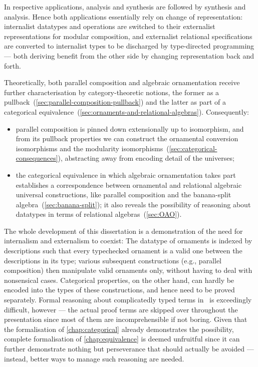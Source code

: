 In respective applications, analysis and synthesis are followed by synthesis and analysis.
Hence both applications essentially rely on change of representation: internalist datatypes and operations are switched to their externalist representations for modular composition, and externalist relational specifications are converted to internalist types to be discharged by type-directed programming --- both deriving benefit from the other side by changing representation back and forth.

Theoretically, both parallel composition and algebraic ornamentation receive further characterisation by category-theoretic notions, the former as a pullback~(\autoref{sec:parallel-composition-pullback}) and the latter as part of a categorical equivalence~(\autoref{sec:ornaments-and-relational-algebras}).
Consequently:
\begin{itemize}
\item parallel composition is pinned down extensionally up to isomorphism, and from its pullback properties we can construct the ornamental conversion isomorphisms and the modularity isomorphisms~(\autoref{sec:categorical-consequences}), abstracting away from encoding detail of the universes;
\item the categorical equivalence in which algebraic ornamentation takes part establishes a correspondence between ornamental and relational algebraic universal constructions, like parallel composition and the banana-split algebra~(\autoref{sec:banana-split}); it also reveals the possibility of reasoning about datatypes in terms of relational algebras~(\autoref{sec:OAO}).
\end{itemize}
The whole development of this dissertation is a demonstration of the need for internalism and externalism to coexist: The datatype of ornaments is indexed by descriptions such that every typechecked ornament is a valid one between the descriptions in its type; various subsequent constructions (e.g., parallel composition) then manipulate valid ornaments only, without having to deal with nonsensical cases.
Categorical properties, on the other hand, can hardly be encoded into the types of these constructions, and hence need to be proved separately.
Formal reasoning about complicatedly typed terms in \Agda\ is exceedingly difficult, however --- the actual proof terms are skipped over throughout the presentation since most of them are incomprehensible if not boring.
Given that the formalisation of \autoref{chap:categorical} already demonstrates the possibility, complete formalisation of \autoref{chap:equivalence} is deemed unfruitful since it can further demonstrate nothing but perseverance that should actually be avoided --- instead, better ways to manage such reasoning are needed.

